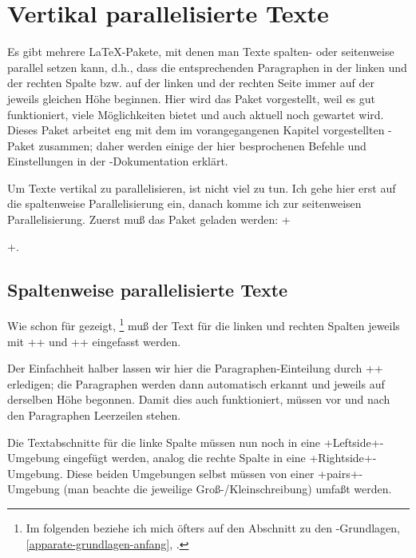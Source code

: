 
\newcommand\reledpar{\mbox{\Package{reledpar}}\xspace}

\section{Vertikal parallelisierte Texte}

\DefineShortVerb{\+}

\noindent Es gibt mehrere \LaTeX-Pakete, mit denen man Texte spalten- oder seitenweise parallel setzen kann, d.h., dass die entsprechenden Paragraphen in der linken und der rechten Spalte bzw. auf der linken und der rechten Seite immer auf der jeweils gleichen Höhe beginnen.
Hier wird das Paket \reledpar vorgestellt, weil es gut funktioniert, viele Möglichkeiten bietet und auch aktuell noch gewartet wird.
Dieses Paket arbeitet eng mit dem im vorangegangenen Kapitel vorgestellten \reledmac-Paket zusammen; daher werden einige der hier besprochenen Befehle und Einstellungen in der \reledmac-Dokumentation erklärt.

Um Texte vertikal zu parallelisieren, ist nicht viel zu tun. Ich gehe hier erst auf die spaltenweise Parallelisierung ein, danach komme ich zur seitenweisen Parallelisierung. Zuerst muß das Paket geladen werden: +\usepackage{reledpar}+.


\subsection{Spaltenweise parallelisierte Texte}

Wie schon für \reledmac gezeigt,%
\footnote{Im folgenden beziehe ich mich öfters auf den Abschnitt zu den \reledmac-Grundlagen, \cref{apparate-grundlagen-anfang}, .}
muß der Text für die linken und rechten Spalten jeweils mit +\beginnumbering+ und +\endnumbering+ eingefasst werden.%

Der Einfachheit halber lassen wir hier die Paragraphen-Einteilung durch +\autopar+ erledigen;
die Paragraphen werden dann automatisch erkannt und jeweils auf derselben Höhe begonnen.
Damit dies auch funktioniert, müssen vor und nach den Paragraphen Leerzeilen stehen.

Die Textabschnitte für die linke Spalte müssen nun noch in eine +Leftside+-Umgebung eingefügt werden, analog die rechte Spalte in eine +Rightside+-Umgebung.
Diese beiden Umgebungen selbst müssen von einer +pairs+-Umgebung (man beachte die jeweilige Groß-/Kleinschreibung) umfaßt werden.

